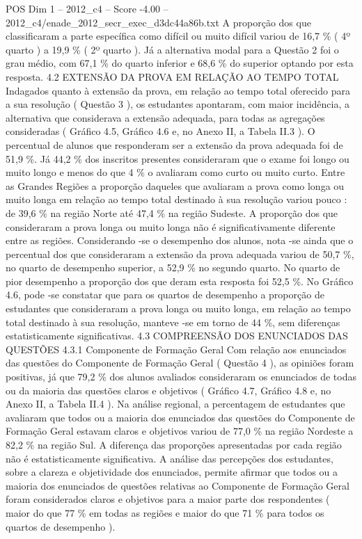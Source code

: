 \begin{textsample}{POS Dim 1 – 2012\_c4 – Score -4.00 – 2012\_c4/enade\_2012\_secr\_exec\_d3dc44a86b.txt}
A proporção dos que classificaram a parte específica como difícil ou muito difícil variou de 16,7 \% ( 4º quarto ) a 19,9 \% ( 2º quarto ).
Já a alternativa modal para a Questão 2 foi o grau médio, com 67,1 \% do quarto inferior e 68,6 \% do superior optando por esta resposta. 4.2 EXTENSÃO DA PROVA EM RELAÇÃO AO TEMPO TOTAL Indagados quanto à extensão da prova, em relação ao tempo total oferecido para a sua resolução ( Questão 3 ), os estudantes apontaram, com maior incidência, a alternativa que considerava a extensão adequada, para todas as agregações consideradas ( Gráfico 4.5, Gráfico 4.6 e, no Anexo II, a Tabela II.3 ).
O percentual de alunos que responderam ser a extensão da prova adequada foi de 51,9 \%.
Já 44,2 \% dos inscritos presentes consideraram que o exame foi longo ou muito longo e menos do que 4 \% o avaliaram como curto ou muito curto.
Entre as Grandes Regiões a proporção daqueles que avaliaram a prova como longa ou muito longa em relação ao tempo total destinado à sua resolução variou pouco : de 39,6 \% na região Norte até 47,4 \% na região Sudeste.
A proporção dos que consideraram a prova longa ou muito longa não é significativamente diferente entre as regiões.
Considerando -se o desempenho dos alunos, nota -se ainda que o percentual dos que consideraram a extensão da prova adequada variou de 50,7 \%, no quarto de desempenho superior, a 52,9 \% no segundo quarto.
No quarto de pior desempenho a proporção dos que deram esta resposta foi 52,5 \%.
No Gráfico 4.6, pode -se constatar que para os quartos de desempenho a proporção de estudantes que consideraram a prova longa ou muito longa, em relação ao tempo total destinado à sua resolução, manteve -se em torno de 44 \%, sem diferenças estatisticamente significativas. 4.3 COMPREENSÃO DOS ENUNCIADOS DAS QUESTÕES 4.3.1 Componente de Formação Geral Com relação aos enunciados das questões do Componente de Formação Geral ( Questão 4 ), as opiniões foram positivas, já que 79,2 \% dos alunos avaliados consideraram os enunciados de todas ou da maioria das questões claros e objetivos ( Gráfico 4.7, Gráfico 4.8 e, no Anexo II, a Tabela II.4 ).
Na análise regional, a percentagem de estudantes que avaliaram que todos ou a maioria dos enunciados das questões do Componente de Formação Geral estavam claros e objetivos variou de 77,0 \% na região Nordeste a 82,2 \% na região Sul.
A diferença das proporções apresentadas por cada região não é estatisticamente significativa.
A análise das percepções dos estudantes, sobre a clareza e objetividade dos enunciados, permite afirmar que todos ou a maioria dos enunciados de questões relativas ao Componente de Formação Geral foram considerados claros e objetivos para a maior parte dos respondentes ( maior do que 77 \% em todas as regiões e maior do que 71 \% para todos os quartos de desempenho ).

\end{textsample}
